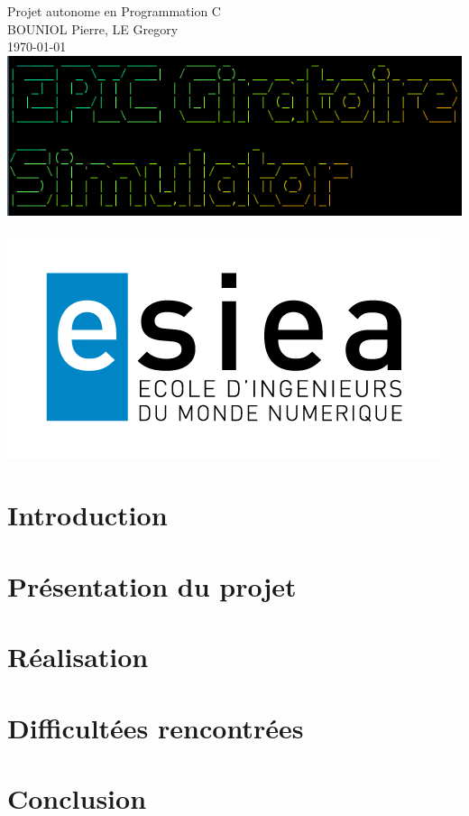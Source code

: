 \documentclass[a4paper,12pt]{report}
\begin{document}
\begin{titlepage}
\begin{center}
{\Huge Projet autonome en Programmation C}\\[4ex] 
{\Large  \textsc{BOUNIOL} Pierre, \textsc{LE} Gregory}\\[4ex] 
\today\\[8ex]
\includegraphics[scale=0.6]{logo2.png}\\[59ex]
\end{center}
\raggedleft
\includegraphics[scale=0.2]{Logo-ESIEA.jpg}
\end{titlepage}

\renewcommand{\contentsname}{Sommaire}

\tableofcontents

\part{Introduction}
\part{Présentation du projet}
\part{Réalisation}
\part{Difficultées rencontrées}
\part{Conclusion}
\end{document}
